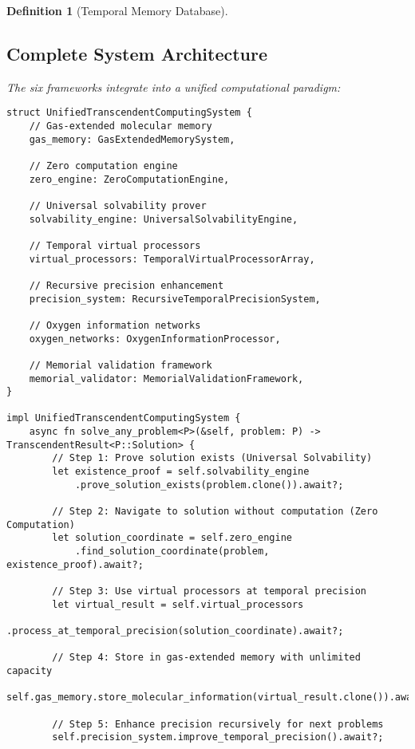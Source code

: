 \documentclass[12pt]{article}
\newtheorem{definition}[theorem]{Definition}
\begin{document}
\begin{definition}[Temporal Memory Database]
\subsection{Complete System Architecture}

The six frameworks integrate into a unified computational paradigm:

\begin{lstlisting}[caption=Unified Transcendent Computing System]
struct UnifiedTranscendentComputingSystem {
    // Gas-extended molecular memory
    gas_memory: GasExtendedMemorySystem,
    
    // Zero computation engine
    zero_engine: ZeroComputationEngine,
    
    // Universal solvability prover
    solvability_engine: UniversalSolvabilityEngine,
    
    // Temporal virtual processors
    virtual_processors: TemporalVirtualProcessorArray,
    
    // Recursive precision enhancement
    precision_system: RecursiveTemporalPrecisionSystem,
    
    // Oxygen information networks
    oxygen_networks: OxygenInformationProcessor,
    
    // Memorial validation framework
    memorial_validator: MemorialValidationFramework,
}

impl UnifiedTranscendentComputingSystem {
    async fn solve_any_problem<P>(&self, problem: P) -> TranscendentResult<P::Solution> {
        // Step 1: Prove solution exists (Universal Solvability)
        let existence_proof = self.solvability_engine
            .prove_solution_exists(problem.clone()).await?;
        
        // Step 2: Navigate to solution without computation (Zero Computation)
        let solution_coordinate = self.zero_engine
            .find_solution_coordinate(problem, existence_proof).await?;
        
        // Step 3: Use virtual processors at temporal precision
        let virtual_result = self.virtual_processors
            .process_at_temporal_precision(solution_coordinate).await?;
        
        // Step 4: Store in gas-extended memory with unlimited capacity
        self.gas_memory.store_molecular_information(virtual_result.clone()).await?;
        
        // Step 5: Enhance precision recursively for next problems
        self.precision_system.improve_temporal_precision().await?;
        

\end{lstlisting}
\end{definition}
\end{document}
